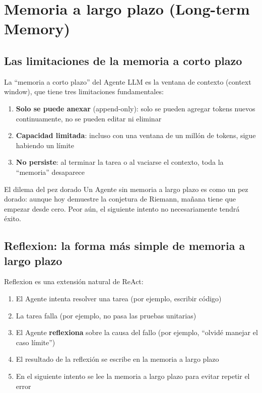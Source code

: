 \section{Memoria a largo plazo (Long-term Memory)}

\subsection{Las limitaciones de la memoria a corto plazo}

La ``memoria a corto plazo'' del Agente LLM es la ventana de contexto (context window), que tiene tres limitaciones fundamentales:

\begin{enumerate}
    \item \textbf{Solo se puede anexar} (append-only): solo se pueden agregar tokens nuevos continuamente, no se pueden editar ni eliminar
    \item \textbf{Capacidad limitada}: incluso con una ventana de un millón de tokens, sigue habiendo un límite
    \item \textbf{No persiste}: al terminar la tarea o al vaciarse el contexto, toda la ``memoria'' desaparece
\end{enumerate}

\begin{warningbox}{El dilema del pez dorado}
Un Agente sin memoria a largo plazo es como un pez dorado: aunque hoy demuestre la conjetura de Riemann, mañana tiene que empezar desde cero. Peor aún, el siguiente intento no necesariamente tendrá éxito.
\end{warningbox}

\subsection{Reflexion: la forma más simple de memoria a largo plazo}

Reflexion es una extensión natural de ReAct:

\begin{enumerate}
    \item El Agente intenta resolver una tarea (por ejemplo, escribir código)
    \item La tarea falla (por ejemplo, no pasa las pruebas unitarias)
    \item El Agente \textbf{reflexiona} sobre la causa del fallo (por ejemplo, ``olvidé manejar el caso límite'')
    \item El resultado de la reflexión se escribe en la memoria a largo plazo
    \item En el siguiente intento se lee la memoria a largo plazo para evitar repetir el error
\end{enumerate}

